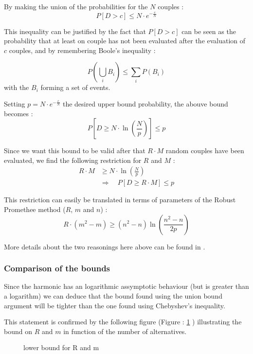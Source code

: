 By making the union of the probabilities for the $N$ couples : 
\begin{equation}
    P[D > c] \le N\cdot e^{-\frac{c}{N}}
\end{equation}

This inequality can be justified by the fact that $P[D > c]$ can be seen as the probability that at least on couple has not been evaluated after the evaluation of $c$ couples, and by remembering 
Boole's inequality : %

\begin{equation}
    P \left( \mathop{\bigcup}_i B_i \right) \le \sum _i P(B_i)
    \label{eqn:Boole_ineq}
\end{equation}
with the $B_i$ forming a set of events.

Setting $p=N\cdot e^{-\frac{c}{N}}$ the desired upper bound probability, the abouve bound becomes :
\begin{equation}
    P[D \ge N\cdot \ln (\frac{N}{p})] \le p 
\end{equation}

Since we want this bound to be valid after that $R\cdot M$ random couples have been evaluated, we find the following restriction for $R$ and $M$ :
\begin{equation}
    \begin{split}
        R\cdot M & \ge N \cdot \ln (\frac{N}{p}) \\    
        & \Rightarrow \quad P[D \ge R\cdot M] \le p
    \end{split}
    \label{eqn:mr_values_unionprob}
\end{equation}

This restriction can easily be translated in terms of parameters of the Robust Promethee method ($R$, $m$ and $n$) :
\begin{equation}
    R\cdot (m^2-m) \ge (n^2-n) \ln (\frac{n^2-n}{2p})
    \label{}
\end{equation}

More details about the two reasonings here above can be found in \cite{Mitzenmacher:2005:PCR:1076315}.

\subsubsection{Comparison of the bounds}

Since the harmonic has an logarithmic assymptotic behaviour (but is greater than a logarithm) we can deduce that the bound found using the union bound argument will be tighter than the one found using Chebyshev's inequality. 

This statement is confirmed by the following figure (Figure : \ref{tbl:bounds} ) illustrating the bound on $R$ and $m$ in function of the number of alternatives.

\begin{figure} 
	\centering
	\newlength\figureheight 
	\newlength\figurewidth 
	\setlength\figureheight{6cm} 
	\setlength\figurewidth{6cm}
	
    \caption{lower bound for R and m}
	\label{tbl:bounds}
\end{figure}


